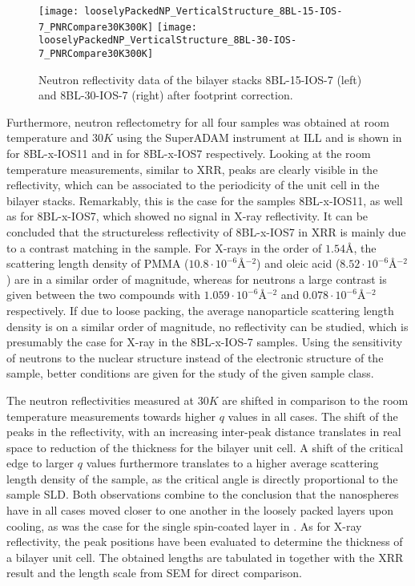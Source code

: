 \documentclass[\main/dresen_thesis.tex]{subfiles}
\begin{document}
  \begin{figure}[tb]
    \centering
    \texttt{[image: looselyPackedNP\_VerticalStructure\_8BL-15-IOS-7\_PNRCompare30K300K]}
    \texttt{[image: looselyPackedNP\_VerticalStructure\_8BL-30-IOS-7\_PNRCompare30K300K]}
    \caption{\label{fig:looselyPackedNS:bilayerStacks:nr300K8BLIOS7}Neutron reflectivity data of the bilayer stacks 8BL-15-IOS-7 (left) and 8BL-30-IOS-7 (right) after footprint correction.}
  \end{figure}

  Furthermore, neutron reflectometry for all four samples was obtained at room temperature and $30 \unit{K}$ using the SuperADAM instrument at ILL and is shown in  for 8BL-x-IOS11 and in  for 8BL-x-IOS7 respectively.
  Looking at the room temperature measurements, similar to XRR, peaks are clearly visible in the reflectivity, which can be associated to the periodicity of the unit cell in the bilayer stacks.
  Remarkably, this is the case for the samples 8BL-x-IOS11, as well as for 8BL-x-IOS7, which showed no signal in X-ray reflectivity.
  It can be concluded that the structureless reflectivity of 8BL-x-IOS7 in XRR is mainly due to a contrast matching in the sample.
  For X-rays in the order of $1.54 \unit{\angstrom}$, the scattering length density of PMMA ($10.8 \cdot \unit{10^{-6} \angstrom^{-2}}$) and oleic acid ($8.52 \cdot \unit{10^{-6} \angstrom^{-2}}$) are in a similar order of magnitude, whereas for neutrons a large contrast is given between the two compounds with $1.059 \cdot \unit{10^{-6} \angstrom^{-2}}$ and $0.078 \cdot \unit{10^{-6} \angstrom^{-2}}$ respectively.
  If due to loose packing, the average nanoparticle scattering length density is on a similar order of magnitude, no reflectivity can be studied, which is presumably the case for X-ray in the 8BL-x-IOS-7 samples.
  Using the sensitivity of neutrons to the nuclear structure instead of the electronic structure of the sample, better conditions are given for the study of the given sample class.

  The neutron reflectivities measured at $30 \unit{K}$ are shifted in comparison to the room temperature measurements towards higher $q$ values in all cases.
  The shift of the peaks in the reflectivity, with an increasing inter-peak distance translates in real space to reduction of the thickness for the bilayer unit cell.
  A shift of the critical edge to larger $q$ values furthermore translates to a higher average scattering length density of the sample, as the critical angle is directly proportional to the sample SLD.
  Both observations combine to the conclusion that the nanospheres have in all cases moved closer to one another in the loosely packed layers upon cooling, as was the case for the single spin-coated layer in .
  As for X-ray reflectivity, the peak positions have been evaluated to determine the thickness of a bilayer unit cell.
  The obtained lengths are tabulated in  together with the XRR result and the length scale from SEM for direct comparison.
\end{document}
